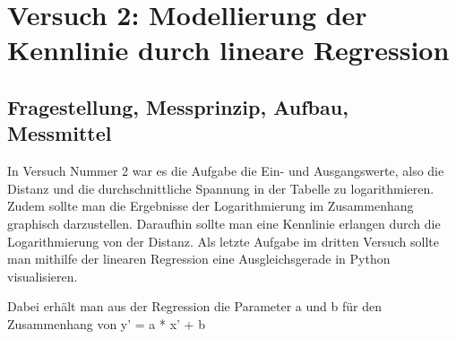 \documentclass[12pt, oneside, a4paper, \docLanguage]{report}
\begin{document}
%
%
\chapter{Versuch 2: Modellierung der Kennlinie durch lineare Regression}
\label{chap:VERSUCH_2}

\section{Fragestellung, Messprinzip, Aufbau, Messmittel}
\label{chap:VERSUCH_2_FRAGESTELLUNG}
In Versuch Nummer 2 war es die Aufgabe die Ein- und Ausgangswerte, also die Distanz und die durchschnittliche Spannung in der Tabelle zu logarithmieren.
Zudem sollte man die Ergebnisse der Logarithmierung im Zusammenhang graphisch darzustellen.
Daraufhin sollte man eine Kennlinie erlangen durch die Logarithmierung von der Distanz.
Als letzte Aufgabe im dritten Versuch sollte man mithilfe der linearen Regression eine Ausgleichsgerade in Python visualisieren. 

Dabei erhält man aus der Regression die Parameter a und b für den Zusammenhang von
y' = a * x' + b
\newpage
\end{document}
